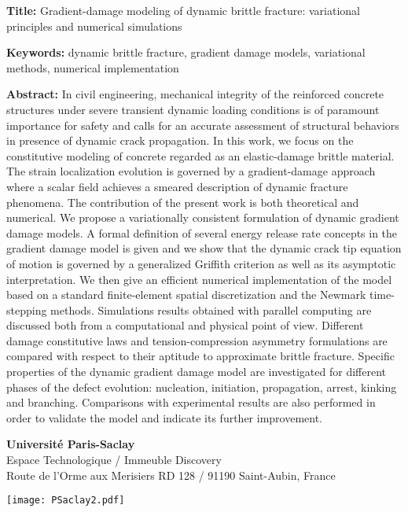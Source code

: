 \begin{flushleft}
\vspace{20pt}

\begin{mdframed}
\textbf{Title:} Gradient-damage modeling of dynamic brittle fracture: variational principles and numerical simulations

\textbf{Keywords:} dynamic brittle fracture, gradient damage models, variational methods, numerical implementation

\textbf{Abstract:} In civil engineering, mechanical integrity of the reinforced concrete structures under severe transient dynamic loading conditions is of paramount importance for safety and calls for an accurate assessment of structural behaviors in presence of dynamic crack propagation. In this work, we focus on the constitutive modeling of concrete regarded as an elastic-damage brittle material. The strain localization evolution is governed by a gradient-damage approach where a scalar field achieves a smeared description of dynamic fracture phenomena. The contribution of the present work is both theoretical and numerical. We propose a variationally consistent formulation of dynamic gradient damage models. A formal definition of several energy release rate concepts in the gradient damage model is given and we show that the dynamic crack tip equation of motion is governed by a generalized Griffith criterion as well as its asymptotic interpretation. We then give an efficient numerical implementation of the model based on a standard finite-element spatial discretization and the Newmark time-stepping methods. Simulations results obtained with parallel computing are discussed both from a computational and physical point of view. Different damage constitutive laws and tension-compression asymmetry formulations are compared with respect to their aptitude to approximate brittle fracture. Specific properties of the dynamic gradient damage model are investigated for different phases of the defect evolution: nucleation, initiation, propagation, arrest, kinking and branching. Comparisons with experimental results are also performed in order to validate the model and indicate its further improvement.
\end{mdframed}
\end{flushleft}

\vfill

\begin{minipage}[b]{0.6\textwidth}
\small
\color{color02}
\textbf{Université Paris-Saclay} \\
Espace Technologique / Immeuble Discovery  \\
Route de l'Orme aux Merisiers RD 128 / 91190 Saint-Aubin, France
\end{minipage}
\hfill
\begin{minipage}[b]{0.35\textwidth}
\hfill
\texttt{[image: PSaclay2.pdf]}
\end{minipage}